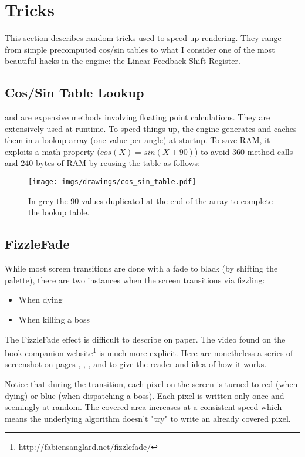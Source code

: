 \section{Tricks}

This section describes random tricks used to speed up rendering. They range from simple precomputed cos/sin tables to what I consider one of the most beautiful hacks in the engine: the Linear Feedback Shift Register.




\subsection{Cos/Sin Table Lookup}
 and  are expensive methods involving floating point calculations. They are extensively used at runtime. To speed things up, the engine generates and caches them in a lookup array (one value per angle) at startup. To save RAM, it exploits a math property ($cos(X) = sin(X + 90)$) to avoid 360  method calls and 240 bytes of RAM by reusing the  table as follows:\\
\par
\label{cossintable}
\begin{minipage}{\textwidth}

\end{minipage}


\begin{figure}[H]
 \centering
  \texttt{[image: imgs/drawings/cos\_sin\_table.pdf]}
  \caption{In grey the 90  values duplicated at the end of the array to complete the  lookup table.}
\end{figure}
\vspace{20pt}







\subsection{FizzleFade}
While most screen transitions are done with a fade to black (by shifting the palette), there are two instances when the screen transitions via fizzling:
\begin{itemize}
	\item When dying
	\item When killing a boss
\end{itemize}
The FizzleFade effect is difficult to describe on paper. The video found on the book companion website\footnote{http://fabiensanglard.net/fizzlefade/} is much more explicit. Here are nonetheless a series of screenshot on pages \pageref{fizzle1}, \pageref{fizzle2}, \pageref{fizzle3}, and \pageref{fizzle4} to give the reader and idea of how it works.\\
\par
 Notice that during the transition, each pixel on the screen is turned to red (when dying) or blue (when dispatching a boss). Each pixel is written only once and seemingly at random. The covered area increases at a consistent speed which means the underlying algorithm doesn't "try" to write an already covered pixel.



